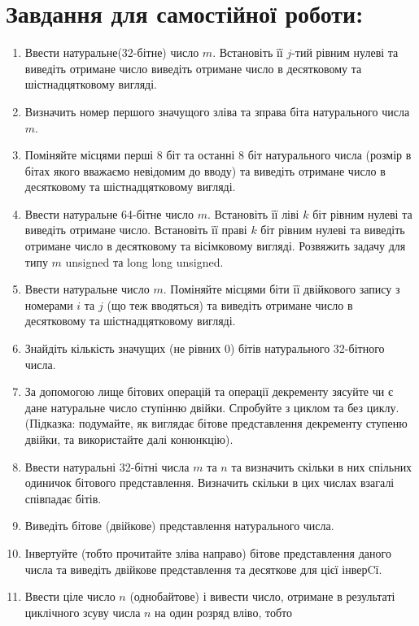 \documentclass[a5paper,titlepage,openany,twoside,draft]{book_unv}%
\begin{document}
\section{Завдання для самостійної роботи:}

\begin{enumerate}
\def\labelenumi{\arabic{enumi})}
\setcounter{enumi}{8}
\item
  Ввести натуральне(32-бітне) число $m$. Встановіть її $j$-тий рівним нулеві
  та виведіть отримане число виведіть отримане число в десятковому та
  шістнадцятковому вигляді.
\item
  Визначить номер першого значущого зліва та зправа біта натурального
  числа $m$.
\item
  Поміняйте місцями перші 8 біт та останні 8 біт натурального числа
  (розмір в бітах якого вважаємо невідомим до вводу) та виведіть
  отримане число в десятковому та шістнадцятковому вигляді.
\item
  Ввести натуральне 64-бітне число $m$. Встановіть її ліві $k$ біт рівним
  нулеві та виведіть отримане число. Встановіть її праві $k$ біт рівним
  нулеві та виведіть отримане число в десятковому та вісімковому
  вигляді. Розвяжить задачу для типу $m$ unsigned та long long unsigned.
\item
  Ввести натуральне число $m$. Поміняйте місцями біти її двійкового запису
  з номерами $i$ та $j$ (що теж вводяться) та виведіть отримане число в
  десятковому та шістнадцятковому вигляді.
\item
  Знайдіть кількість значущих (не рівних 0) бітів натурального
  32-бітного числа.
\item
  За допомогою лище бітових операцій та операції декременту зясуйте чи є
  дане натуральне число ступінню двійки. Спробуйте з циклом та без
  циклу. (Підказка: подумайте, як виглядає бітове представлення
  декременту ступеню двійки, та використайте далі конюнкцію).
\item
  Ввести натуральні 32-бітні числа $m$ та $n$ та визначить скільки в них
  спільних одиничок бітового представлення. Визначить скільки в цих
  числах взагалі співпадає бітів.
\item
  Виведіть бітове (двійкове) представлення натурального числа.
\item
  Інвертуйте (тобто прочитайте зліва направо) бітове представлення
  даного числа та виведіть двійкове представлення та десяткове для цієї
  інверCї.
\item
  Ввести ціле число $n$ (однобайтове) і вивести число, отримане в
  результаті циклічного зсуву числа $n$ на один розряд вліво, тобто

\end{enumerate}
\end{document}
